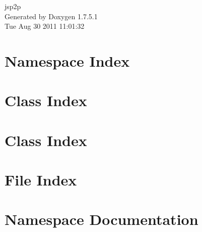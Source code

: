 \documentclass[a4paper]{book}
\begin{document}
\hypersetup{pageanchor=false,citecolor=blue}
\begin{titlepage}
\vspace*{7cm}
\begin{center}
{\Large jsp2p }\\
\vspace*{1cm}
{\large \-Generated by Doxygen 1.7.5.1}\\
\vspace*{0.5cm}
{\small Tue Aug 30 2011 11:01:32}\\
\end{center}
\end{titlepage}
\clearemptydoublepage
{}
\tableofcontents
\clearemptydoublepage
{}
\hypersetup{pageanchor=true,citecolor=blue}
\chapter{\-Namespace \-Index}

\chapter{\-Class \-Index}

\chapter{\-Class \-Index}

\chapter{\-File \-Index}

\chapter{\-Namespace \-Documentation}










\end{document}
